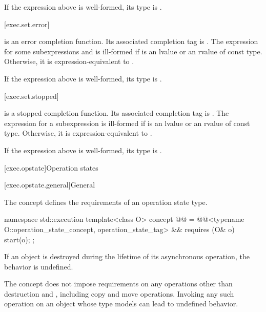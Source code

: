 \mandates
If the expression above is well-formed, its type is .

[exec.set.error]{}

\pnum
{} is an error completion function.
Its associated completion tag is .
The expression 
for some subexpressions  and  is ill-formed
if  is an lvalue or an rvalue of const type.
Otherwise, it is expression-equivalent to
.

\mandates
If the expression above is well-formed, its type is .

[exec.set.stopped]{}

\pnum
{} is a stopped completion function.
Its associated completion tag is .
The expression 
for a subexpression  is ill-formed
if  is an lvalue or an rvalue of const type.
Otherwise, it is expression-equivalent to
.

\mandates
If the expression above is well-formed, its type is .

[exec.opstate]{Operation states}

[exec.opstate.general]{General}

\pnum
The  concept defines
the requirements of an operation state type.
\begin{codeblock}
namespace std::execution {
  template<class O>
    concept @@ =
      @@<typename O::operation_state_concept, operation_state_tag> &&
      requires (O& o) {
        start(o);
      };
}
\end{codeblock}

\pnum
If an  object is destroyed
during the lifetime of its asynchronous operation,
the behavior is undefined.
\begin{note}
The  concept does not impose requirements
on any operations other than destruction and ,
including copy and move operations.
Invoking any such operation on an object
whose type models  can lead to undefined behavior.
\end{note}

